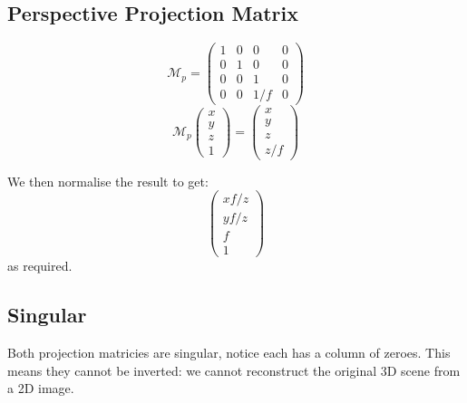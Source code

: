 \documentclass[11pt]{article}
\begin{document}
\subsection{Perspective Projection Matrix}
\[
  \mathcal{M}_p =
  \begin{pmatrix}
    1 & 0 & 0 & 0 \\
    0 & 1 & 0 & 0 \\
    0 & 0 & 1 & 0 \\
    0 & 0 & 1 / f & 0
  \end{pmatrix}
\]
\[
  \mathcal{M}_p
  \begin{pmatrix}
    x \\ y \\ z \\ 1
  \end{pmatrix}
  =
  \begin{pmatrix}
    x \\ y \\ z \\ z / f
  \end{pmatrix}
\]

We then normalise the result to get:
\[
  \begin{pmatrix} xf/z \\ yf/z \\ f \\ 1 \end{pmatrix}  
\]
as required.

\subsection{Singular}
Both projection matricies are singular, notice each has a column of zeroes.
This means they cannot be inverted: we cannot reconstruct the original 3D scene from a 2D image.
\end{document}

